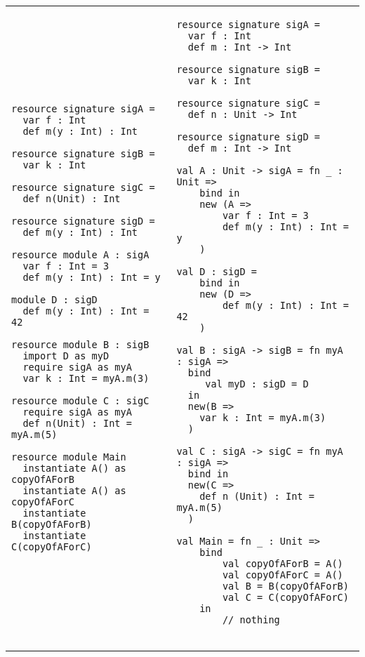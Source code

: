\documentclass{llncs}
\begin{document}
\begin{tabular}{p{}p{}}
\begin{minipage}[t]{\textwidth}
\begin{lstlisting}
resource signature sigA =
  var f : Int
  def m(y : Int) : Int

resource signature sigB =
  var k : Int

resource signature sigC =
  def n(Unit) : Int

resource signature sigD =
  def m(y : Int) : Int

resource module A : sigA
  var f : Int = 3
  def m(y : Int) : Int = y

module D : sigD
  def m(y : Int) : Int = 42

resource module B : sigB
  import D as myD
  require sigA as myA
  var k : Int = myA.m(3)

resource module C : sigC
  require sigA as myA
  def n(Unit) : Int = myA.m(5)

resource module Main
  instantiate A() as copyOfAForB 
  instantiate A() as copyOfAForC 
  instantiate B(copyOfAForB)
  instantiate C(copyOfAForC)

\end{lstlisting}
\end{minipage}
&
\hspace{-10ex}
\begin{minipage}[t]{\textwidth}
\begin{lstlisting}
resource signature sigA =
  var f : Int
  def m : Int -> Int

resource signature sigB =
  var k : Int

resource signature sigC =
  def n : Unit -> Int

resource signature sigD =
  def m : Int -> Int
  
val A : Unit -> sigA = fn _ : Unit =>
    bind in
    new (A =>
        var f : Int = 3
        def m(y : Int) : Int = y
    )
    
val D : sigD =
    bind in
    new (D =>
        def m(y : Int) : Int = 42
    )

val B : sigA -> sigB = fn myA : sigA =>
  bind
     val myD : sigD = D
  in
  new(B =>
    var k : Int = myA.m(3)
  )

val C : sigA -> sigC = fn myA : sigA =>
  bind in
  new(C =>
    def n (Unit) : Int = myA.m(5)
  )

val Main = fn _ : Unit =>
    bind
        val copyOfAForB = A()
        val copyOfAForC = A()
        val B = B(copyOfAForB)
        val C = C(copyOfAForC)
    in
        // nothing
        
\end{lstlisting}
\end{minipage}
\end{tabular}
\end{document}
